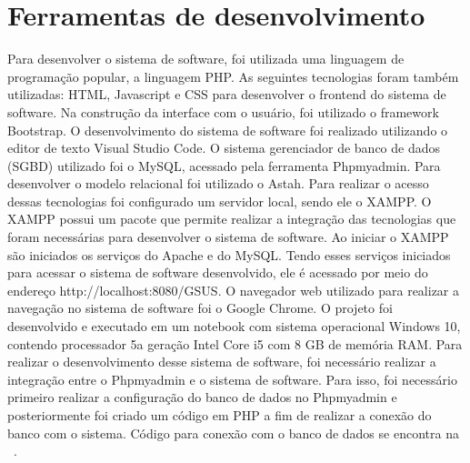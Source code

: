 \section{Ferramentas de desenvolvimento}
Para desenvolver o sistema de software, foi utilizada uma linguagem de programação popular, a linguagem PHP. As seguintes tecnologias foram também utilizadas: \acrfull{HTML}, Javascript e \acrfull{CSS} para desenvolver o frontend do sistema de software. Na construção da interface com o usuário, foi utilizado o framework Bootstrap. O desenvolvimento do sistema de software foi realizado utilizando o editor de texto Visual Studio Code. O sistema gerenciador de banco de dados (SGBD) utilizado foi o MySQL, acessado pela ferramenta Phpmyadmin. Para desenvolver o modelo relacional foi utilizado o Astah. Para realizar o acesso dessas tecnologias foi configurado um servidor local, sendo ele o XAMPP. O XAMPP possui um pacote que permite realizar a integração das tecnologias que foram necessárias para desenvolver o sistema de software. Ao iniciar o XAMPP são iniciados os serviços do Apache e do MySQL. Tendo esses serviços iniciados para acessar o sistema de software desenvolvido, ele é acessado por meio do endereço http://localhost:8080/GSUS. O navegador web utilizado para realizar a navegação no sistema de software foi o Google Chrome. O projeto foi desenvolvido e executado em um notebook com sistema operacional Windows 10, contendo processador 5a geração Intel Core i5 com 8 GB de memória RAM. Para realizar o desenvolvimento desse sistema de software, foi necessário realizar a integração entre o Phpmyadmin e o sistema de software. Para isso, foi necessário primeiro realizar a configuração do banco de dados no Phpmyadmin e posteriormente foi criado um código em PHP a fim de realizar a conexão do banco com o sistema. Código para conexão com o banco de dados se encontra na ~.


%